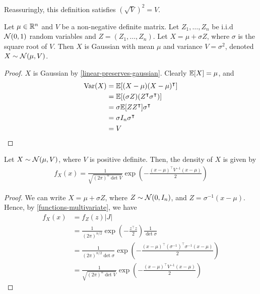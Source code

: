 \documentclass{../../template/note}
\begin{document}
    \begin{remark*}
        Reassuringly, this definition satisfies \((\sqrt V)^2 = V\).
    \end{remark*}
    
    \begin{lemma}
        Let \(\mu \in \mathbb R^n\) and \(V\) be a non-negative definite matrix. Let \(Z_1, \dots, Z_n\) be i.i.d \(\mathcal{N}(0, 1)\) random variables and \(Z = (Z_1, \dots, Z_n)\). Let \(X = \mu + \sigma Z\), where \(\sigma\) is the square root of \(V\). Then \(X\) is Gaussian with mean \(\mu\) and variance \(V = \sigma^2\), denoted \(X \sim \mathcal{N}(\mu, V)\).
    \end{lemma}
    
    \begin{proof}
        \(X\) is Gaussian by \cref{linear-preserves-gaussian}. Clearly \(\mathbb E[X] = \mu\), and
        \begin{align*}
            \operatorname{Var}(X) &= \mathbb E[(X-\mu)(X-\mu)^\intercal] \\
            &= \mathbb E[(\sigma Z)(Z^\intercal \sigma^\intercal)] \\
            &= \sigma \mathbb E[ZZ^\intercal] \sigma^\intercal \\
            &= \sigma I_n \sigma^\intercal \\
            &= V
        \end{align*}
    \end{proof}
    
    \begin{proposition}
        Let \(X \sim \mathcal{N}(\mu, V)\), where \(V\) is positive definite. Then, the density of \(X\) is given by
        \begin{align*}
            f_X(x) = \frac 1{\sqrt{(2\pi)^n \det V}} \exp\left(-\frac{(x-\mu)^\intercal V^{-1} (x-\mu)} 2\right)
        \end{align*}
    \end{proposition}
    
    \begin{proof}
        We can write \(X = \mu + \sigma Z\), where \(Z \sim \mathcal{N}(0, I_n)\), and \(Z = \sigma^{-1}(x-\mu)\). Hence, by \cref{functions-multivariate}, we have
        \begin{align*}
            f_X(x) &= f_Z(z) |J| \\
            &= \frac 1{(2\pi)^{n/2}}\exp\left(-\frac{z^\intercal z}2\right) \frac 1{\det \sigma} \\
            &= \frac 1{(2\pi)^{n/2} \det \sigma}\exp\left(-\frac{(x-\mu)^\intercal (\sigma^{-1})^\intercal \sigma^{-1} (x-\mu)}2\right) \\
            &= \frac 1{\sqrt{(2\pi)^n \det V}} \exp\left(-\frac{(x-\mu)^\intercal V^{-1} (x-\mu)} 2\right)
        \end{align*}
    \end{proof}
    
\end{document}

